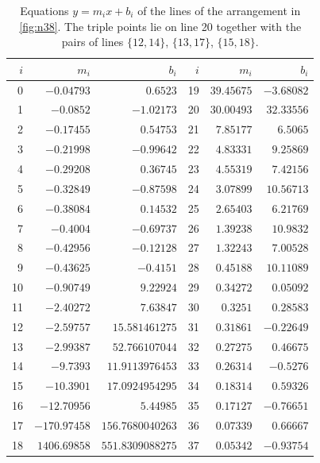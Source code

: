 \begin{table}[t]
\centering
\small
\caption{Equations $y=m_ix+b_i$ of the lines of the arrangement in \cref{fig:n38}. The triple points lie on line 20 together with the pairs of lines $\{12,14\}$, $\{13,17\}$, $\{15,18\}$.}
\label{tab:n38-lines}
\renewcommand{\arraystretch}{1.15}
\begin{tabular}{rrr@{\qquad}rrr}
\toprule
$i$ & $m_i$ & $b_i$ & $i$ & $m_i$ & $b_i$ \\
\midrule
0 & $-0.04793$ & $0.6523$ & 19 & $39.45675$ & $-3.68082$ \\
1 & $-0.0852$ & $-1.02173$ & 20 & $30.00493$ & $32.33556$ \\
2 & $-0.17455$ & $0.54753$ & 21 & $7.85177$ & $6.5065$ \\
3 & $-0.21998$ & $-0.99642$ & 22 & $4.83331$ & $9.25869$ \\
4 & $-0.29208$ & $0.36745$ & 23 & $4.55319$ & $7.42156$ \\
5 & $-0.32849$ & $-0.87598$ & 24 & $3.07899$ & $10.56713$ \\
6 & $-0.38084$ & $0.14532$ & 25 & $2.65403$ & $6.21769$ \\
7 & $-0.4004$ & $-0.69737$ & 26 & $1.39238$ & $10.9832$ \\
8 & $-0.42956$ & $-0.12128$ & 27 & $1.32243$ & $7.00528$ \\
9 & $-0.43625$ & $-0.4151$ & 28 & $0.45188$ & $10.11089$ \\
10 & $-0.90749$ & $9.22924$ & 29 & $0.34272$ & $0.05092$ \\
11 & $-2.40272$ & $7.63847$ & 30 & $0.3251$ & $0.28583$ \\
12 & $-2.59757$ & $15.581461275$ & 31 & $0.31861$ & $-0.22649$ \\
13 & $-2.99387$ & $52.766107044$ & 32 & $0.27275$ & $0.46675$ \\
14 & $-9.7393$ & $11.9113976453$ & 33 & $0.26314$ & $-0.5276$ \\
15 & $-10.3901$ & $17.0924954295$ & 34 & $0.18314$ & $0.59326$ \\
16 & $-12.70956$ & $5.44985$ & 35 & $0.17127$ & $-0.76651$ \\
17 & $-170.97458$ & $156.7680040263$ & 36 & $0.07339$ & $0.66667$ \\
18 & $1406.69858$ & $551.8309088275$ & 37 & $0.05342$ & $-0.93754$ \\
\bottomrule
\end{tabular}
\end{table}

